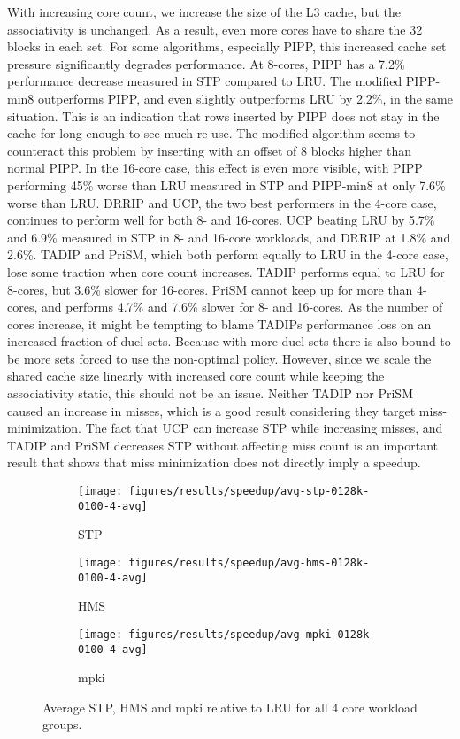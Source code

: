 With increasing core count, we increase the size of the L3 cache, but the associativity is unchanged.
As a result, even more cores have to share the 32 blocks in each set.
For some algorithms, especially PIPP, this increased cache set pressure significantly degrades performance.
At 8-cores, PIPP has a 7.2\% performance decrease measured in STP compared to LRU.
The modified PIPP-min8 outperforms PIPP, and even slightly outperforms LRU by 2.2\%, in the same situation.
This is an indication that rows inserted by PIPP does not stay in the cache for long enough to see much re-use.
The modified algorithm seems to counteract this problem by inserting with an offset of 8 blocks higher than normal PIPP.
In the 16-core case, this effect is even more visible, with PIPP performing 45\% worse than LRU measured in STP and PIPP-min8 at only 7.6\% worse than LRU.
DRRIP and UCP, the two best performers in the 4-core case, continues to perform well for both 8- and 16-cores.
UCP beating LRU by 5.7\% and 6.9\% measured in STP in 8- and 16-core workloads, and DRRIP at 1.8\% and 2.6\%.
TADIP and PriSM, which both perform equally to LRU in the 4-core case, lose some traction when core count increases.
TADIP performs equal to LRU for 8-cores, but 3.6\% slower for 16-cores.
PriSM cannot keep up for more than 4-cores, and performs 4.7\% and 7.6\% slower for 8- and 16-cores.
As the number of cores increase, it might be tempting to blame TADIPs performance loss on an increased fraction of duel-sets.
Because with more duel-sets there is also bound to be more sets forced to use the non-optimal policy.
However, since we scale the shared cache size linearly with increased core count while keeping the associativity static, this should not be an issue.
Neither TADIP nor PriSM caused an increase in misses, which is a good result considering they target miss-minimization.
The fact that UCP can increase STP while increasing misses, and TADIP and PriSM decreases STP without affecting miss count is an important result that shows that miss minimization does not directly imply a speedup.

\begin{figure}
    \centering
    \begin{subfigure}[b]{0.6\textwidth}
        \texttt{[image: figures/results/speedup/avg-stp-0128k-0100-4-avg]}
        \caption{STP}
        \label{fig:results:base:4-avg:stp}
    \end{subfigure}
    \begin{subfigure}[b]{0.6\textwidth}
        \texttt{[image: figures/results/speedup/avg-hms-0128k-0100-4-avg]}
        \caption{HMS}
        \label{fig:results:base:4-avg:hms}
    \end{subfigure}
    \begin{subfigure}[b]{0.6\textwidth}
        \texttt{[image: figures/results/speedup/avg-mpki-0128k-0100-4-avg]}
        \caption{mpki}
        \label{fig:results:base:4-avg:mpki}
    \end{subfigure}
    \caption{Average STP, HMS and mpki relative to LRU for all 4 core workload groups.}
    \label{fig:results:base:4-avg} 
\end{figure}

